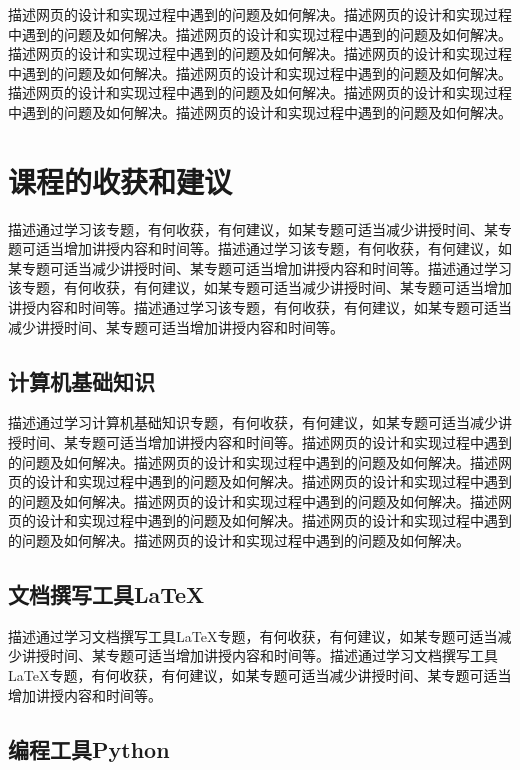 \documentclass[supercite]{Experimental_Report}
\theoremstyle{definition}
\begin{document}
描述网页的设计和实现过程中遇到的问题及如何解决。描述网页的设计和实现过程中遇到的问题及如何解决。描述网页的设计和实现过程中遇到的问题及如何解决。描述网页的设计和实现过程中遇到的问题及如何解决。描述网页的设计和实现过程中遇到的问题及如何解决。描述网页的设计和实现过程中遇到的问题及如何解决。描述网页的设计和实现过程中遇到的问题及如何解决。描述网页的设计和实现过程中遇到的问题及如何解决。描述网页的设计和实现过程中遇到的问题及如何解决。

\newpage

\section{课程的收获和建议}

描述通过学习该专题，有何收获，有何建议，如某专题可适当减少讲授时间、某专题可适当增加讲授内容和时间等。描述通过学习该专题，有何收获，有何建议，如某专题可适当减少讲授时间、某专题可适当增加讲授内容和时间等。描述通过学习该专题，有何收获，有何建议，如某专题可适当减少讲授时间、某专题可适当增加讲授内容和时间等。描述通过学习该专题，有何收获，有何建议，如某专题可适当减少讲授时间、某专题可适当增加讲授内容和时间等。

\subsection{计算机基础知识}

描述通过学习计算机基础知识专题，有何收获，有何建议，如某专题可适当减少讲授时间、某专题可适当增加讲授内容和时间等。描述网页的设计和实现过程中遇到的问题及如何解决。描述网页的设计和实现过程中遇到的问题及如何解决。描述网页的设计和实现过程中遇到的问题及如何解决。描述网页的设计和实现过程中遇到的问题及如何解决。描述网页的设计和实现过程中遇到的问题及如何解决。描述网页的设计和实现过程中遇到的问题及如何解决。描述网页的设计和实现过程中遇到的问题及如何解决。描述网页的设计和实现过程中遇到的问题及如何解决。

\subsection{文档撰写工具LaTeX}

描述通过学习文档撰写工具LaTeX专题，有何收获，有何建议，如某专题可适当减少讲授时间、某专题可适当增加讲授内容和时间等。描述通过学习文档撰写工具LaTeX专题，有何收获，有何建议，如某专题可适当减少讲授时间、某专题可适当增加讲授内容和时间等。

\subsection{编程工具Python}
\end{document}
